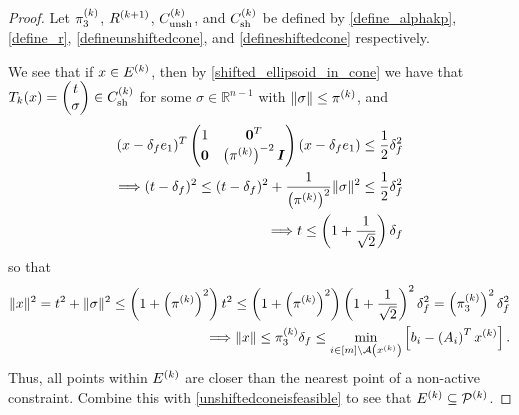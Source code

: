 \begin{proof}
Let $\pi_3^{(k)}$, ${R^{(k+1)}}$, ${C^{(k)}_{\textrm{unsh}}}$, and ${C^{(k)}_{\textrm{sh}}}$ be defined by
\cref{define_alphakp}, \cref{define_r}, \cref{defineunshiftedcone}, and \cref{defineshiftedcone}
respectively.


We see that if $x \in {E^{(k)}}$,
then by \cref{shifted_ellipsoid_in_cone} we have that $T_k(x) = \begin{pmatrix}t\\ \sigma\end{pmatrix} \in {C^{(k)}_{\textrm{sh}}}$ for some $\sigma \in \mathbb R^{n-1}$
with $\left\|\sigma\right\| \le \pi^{(k)}$, and
\begin{align*}
(x - \delta_{f} e_1)^T\begin{pmatrix}
1 & \boldsymbol0^T \\
\boldsymbol 0 & \left(\pi^{(k)}\right)^{-2} \boldsymbol I \\
\end{pmatrix}(x - \delta_{f} e_1) \le \frac 1 2 \delta_{f}^2 \\
\Longrightarrow (t - \delta_{f})^2 \le (t - \delta_{f})^2 + \frac {1} {\left(\pi^{(k)}\right)^2} \|\sigma\|^2 \le \frac 1 2 \delta_{f}^2 \\
\Longrightarrow t \le \left(1 + \frac 1 {\sqrt{2}}\right) \delta_{f}
\end{align*}
so that 
\begin{align*}
\|x\|^2 = t^2 + \|\sigma\|^2 \le \left(1 + \left(\pi^{(k)}\right)^2 \right) t^2 
\le \left(1 + \left(\pi^{(k)}\right)^2 \right) \left(1 + \frac 1 {\sqrt{2}}\right)^2 \delta_{f}^2 
= \left(\pi_3^{(k)}\right)^2 \delta_{f}^2 \\
\Longrightarrow \|x\| \le \pi_3^{(k)} \delta_{f} \le \min_{i \in [m] \setminus {\mathcal A}\left(x^{(k)}\right)} \left[{{b}}_i - \left({{A}}_i\right)^Tx^{(k)}\right].
\end{align*}
Thus, all points within ${E^{(k)}}$ are closer than the nearest point of a non-active constraint.
Combine this with \cref{unshiftedconeisfeasible} to see that ${E^{(k)}} \subseteq {{\mathcal{P}}^{(k)}}$.
\end{proof}




